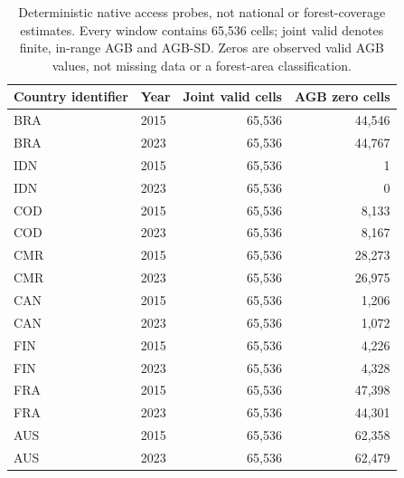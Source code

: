 \begin{table}[htbp]
\centering\small
\caption{Deterministic native access probes, not national or forest-coverage estimates. Every window contains 65,536 cells; joint valid denotes finite, in-range AGB and AGB-SD. Zeros are observed valid AGB values, not missing data or a forest-area classification.}\label{tab:nativecoverage}
\begin{tabular}{llrr}
\toprule
Country identifier & Year & Joint valid cells & AGB zero cells\\\midrule
BRA & 2015 & 65,536 & 44,546\\
BRA & 2023 & 65,536 & 44,767\\
IDN & 2015 & 65,536 & 1\\
IDN & 2023 & 65,536 & 0\\
COD & 2015 & 65,536 & 8,133\\
COD & 2023 & 65,536 & 8,167\\
CMR & 2015 & 65,536 & 28,273\\
CMR & 2023 & 65,536 & 26,975\\
CAN & 2015 & 65,536 & 1,206\\
CAN & 2023 & 65,536 & 1,072\\
FIN & 2015 & 65,536 & 4,226\\
FIN & 2023 & 65,536 & 4,328\\
FRA & 2015 & 65,536 & 47,398\\
FRA & 2023 & 65,536 & 44,301\\
AUS & 2015 & 65,536 & 62,358\\
AUS & 2023 & 65,536 & 62,479\\
\bottomrule
\end{tabular}
\end{table}
